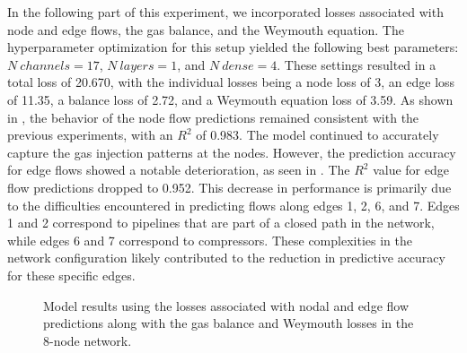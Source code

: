 In the following part of this experiment, we incorporated losses associated with node and edge flows, the gas balance, and the Weymouth equation. The hyperparameter optimization for this setup yielded the following best parameters: $N \ channels=17$, $N \ layers =1$, and $N \ dense =4$. These settings resulted in a total loss of 20.670, with the individual losses being a node loss of 3, an edge loss of 11.35, a balance loss of 2.72, and a Weymouth equation loss of 3.59. As shown in , the behavior of the node flow predictions remained consistent with the previous experiments, with an $R^2$ of 0.983. The model continued to accurately capture the gas injection patterns at the nodes. However, the prediction accuracy for edge flows showed a notable deterioration, as seen in . The $R^2$ value for edge flow predictions dropped to 0.952. This decrease in performance is primarily due to the difficulties encountered in predicting flows along edges 1, 2, 6, and 7. Edges 1 and 2 correspond to pipelines that are part of a closed path in the network, while edges 6 and 7 correspond to compressors. These complexities in the network configuration likely contributed to the reduction in predictive accuracy for these specific edges.

\begin{figure}[h]
    \centering
    \setlength{}        
    \setlength{} 
    
    \caption{Model results using the losses associated with nodal and edge flow predictions along with the gas balance and Weymouth losses in the 8-node network.}
    \label{fig:dummy_base_results}
\end{figure}

